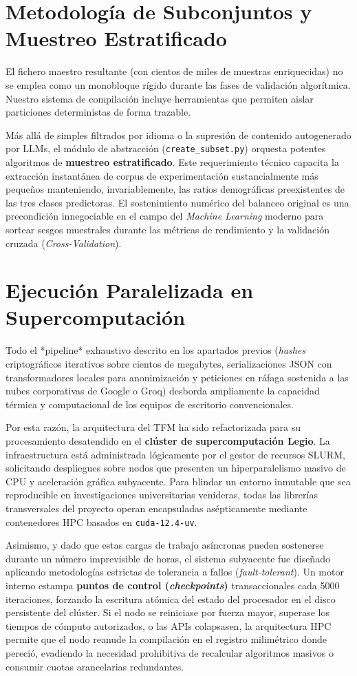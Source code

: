 \section{Metodología de Subconjuntos y Muestreo Estratificado}
\label{sec:subconjuntos}
El fichero maestro resultante (con cientos de miles de muestras enriquecidas) no se emplea como un monobloque rígido durante las fases de validación algorítmica. Nuestro sistema de compilación incluye herramientas que permiten aislar particiones deterministas de forma trazable. 

Más allá de simples filtrados por idioma o la supresión de contenido autogenerado por LLMs, el módulo de abstracción (\texttt{create\_subset.py}) orquesta potentes algoritmos de \textbf{muestreo estratificado}. Este requerimiento técnico capacita la extracción instantánea de corpus de experimentación sustancialmente más pequeños manteniendo, invariablemente, las ratios demográficas preexistentes de las tres clases predictoras. El sostenimiento numérico del balanceo original es una precondición innegociable en el campo del \textit{Machine Learning} moderno para sortear sesgos muestrales durante las métricas de rendimiento y la validación cruzada (\textit{Cross-Validation}).

\section{Ejecución Paralelizada en Supercomputación}
\label{sec:ejecucion_hpc}
Todo el *pipeline* exhaustivo descrito en los apartados previos (\textit{hashes} criptográficos iterativos sobre cientos de megabytes, serializaciones JSON con transformadores locales para anonimización y peticiones en ráfaga sostenida a las nubes corporativas de Google o Groq) desborda ampliamente la capacidad térmica y computacional de los equipos de escritorio convencionales.

Por esta razón, la arquitectura del TFM ha sido refactorizada para su procesamiento desatendido en el \textbf{clúster de supercomputación Legio}. La infraestructura está administrada lógicamente por el gestor de recursos SLURM, solicitando despliegues sobre nodos que presenten un hiperparalelismo masivo de CPU y aceleración gráfica subyacente. Para blindar un entorno inmutable que sea reproducible en investigaciones universitarias venideras, todas las librerías transversales del proyecto operan encapsuladas asépticamente mediante contenedores HPC basados en \texttt{cuda-12.4-uv}.

Asimismo, y dado que estas cargas de trabajo asíncronas pueden sostenerse durante un número imprevisible de horas, el sistema subyacente fue diseñado aplicando metodologías estrictas de tolerancia a fallos (\textit{fault-tolerant}). Un motor interno estampa \textbf{puntos de control (\textit{checkpoints})} transaccionales cada 5000 iteraciones, forzando la escritura atómica del estado del procesador en el disco persistente del clúster. Si el nodo se reiniciase por fuerza mayor, superase los tiempos de cómputo autorizados, o las APIs colapsasen, la arquitectura HPC permite que el nodo reanude la compilación en el registro milimétrico donde pereció, evadiendo la necesidad prohibitiva de recalcular algoritmos masivos o consumir cuotas arancelarias redundantes.